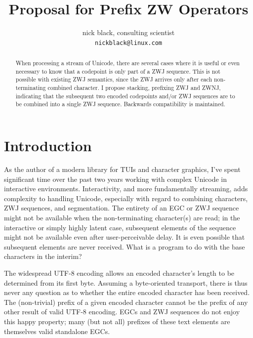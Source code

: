 \documentclass[letterpaper,10pt]{article}
\title{Proposal for Prefix ZW Operators}
\author{nick black, consulting scientist\\
\texttt{nickblack@linux.com}
}
\begin{document}
%
\maketitle
\date{}
\vspace{1in}
\begin{abstract}
When processing a stream of Unicode, there are several cases where it
is useful or even necessary to know that a codepoint is only part of a
ZWJ sequence. This is not possible with existing ZWJ semantics, since
the ZWJ arrives only after each non-terminating combined character. I
propose stacking, prefixing ZWJ and ZWNJ, indicating that the subsequent two
encoded codepoints and/or ZWJ sequences are to be combined into a single
ZWJ sequence. Backwards compatibility is maintained.
\end{abstract}
\thispagestyle{empty}

\section{Introduction}
As the author of a modern library for TUIs and character graphics\cite{notcurses},
I've spent significant time over the past two years working with
complex Unicode in interactive environments. Interactivity, and more
fundamentally streaming, adds complexity to handling Unicode, especially
with regard to combining characters, ZWJ sequences\cite{zwjseqs}, and
segmentation\cite{segmentation}. The entirety of an EGC or ZWJ sequence
might not be available when the non-terminating character(s) are read;
in the interactive or simply highly latent case, subsequent elements of
the sequence might not be available even after user-perceivable delay.
It is even possible that subsequent elements are never received. What is
a program to do with the base characters in the interim?

The widespread UTF-8 encoding\cite{RFC3629} allows an encoded character's
length to be determined from its first byte. Assuming a byte-oriented
transport, there is thus never any question as to whether the entire encoded
character has been received. The (non-trivial) prefix of a given encoded
character cannot be the prefix of any other result of valid UTF-8 encoding.
EGCs and ZWJ sequences do not enjoy this happy property; many (but not all)
prefixes of these text elements are themselves valid standalone EGCs.
\end{document}
